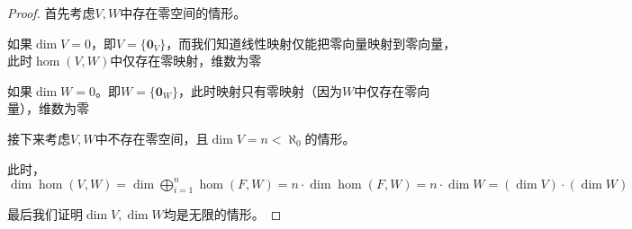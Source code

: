 \documentclass[12pt, a4paper, oneside, UTF8]{ctexbook}
\begin{document}
			\begin{proof}
				首先考虑$V,W$中存在零空间的情形。

				如果$\dim V=0$，即$V=\{\mathbf{0}_{V}\}$，而我们知道线性映射仅能把零向量映射到零向量，此时$\hom(V,W)$中仅存在零映射，维数为零

				如果$\dim W=0$。即$W=\{\mathbf{0}_W\}$，此时映射只有零映射（因为$W$中仅存在零向量），维数为零

				接下来考虑$V,W$中不存在零空间，且$\dim V = n < \aleph_0$的情形。

				此时，$\dim \hom(V,W) =\dim \bigoplus_{i=1}^{n} \hom(F,W) = n \cdot \dim \hom(F,W) = n \cdot \dim W = (\dim V)\cdot (\dim W)$

				最后我们证明$\dim V,\dim W$均是无限的情形。


			\end{proof}
	\ifx\allfiles\undefined
\end{document}
